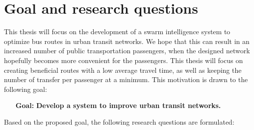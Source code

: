 \section{Goal and research questions}
\label{sec:goalAndResearchQuestions}
This thesis will focus on the development of a swarm intelligence system to optimize bus routes in urban transit networks. We hope that this can result in an increased number of public transportation passengers, when the designed network hopefully becomes more convenient for the passengers. This thesis will focus on creating beneficial routes with a low average travel time, as well as keeping the number of transfer per passenger at a minimum. This motivation is drawn to the following goal: 


\begin{itemize}
\item[\textbf{Goal:}] \label{itm:goal} \textbf{Develop a system to improve urban transit networks.}
\end{itemize}

Based on the proposed goal, the following research questions are formulated: 

